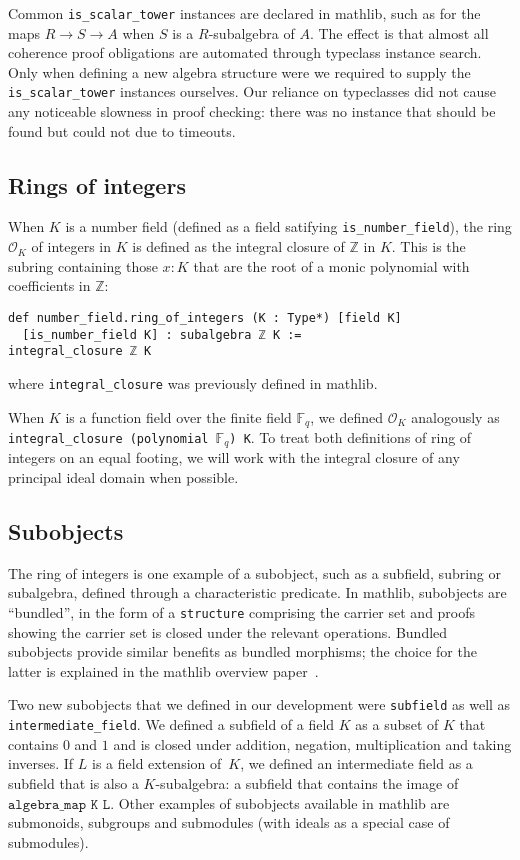 \documentclass[a4paper,USenglish,cleveref, autoref, thm-restate]{lipics-v2021}
\newcommand{\lean}[1]{\texttt{#1}\xspace}
\newcommand*{\OK}[1][K]{\mathcal{O}_{#1}}
\newcommand*{\Fq}[1][q]{\mathbb{F}_{#1}}
\newcommand{\mathlib}{\textsf{mathlib}\xspace}
\newcommand{\Z}{\mathbb{Z}}
\begin{document}
Common \lean{is\_scalar\_tower} instances are declared in \mathlib,
such as for the maps $R \to S \to A$ when $S$ is a $R$-subalgebra of $A$.
The effect is that almost all coherence proof obligations are automated through typeclass instance search.
Only when defining a new algebra structure were we required to supply the \lean{is\_scalar\_tower} instances ourselves.
Our reliance on typeclasses did not cause any noticeable slowness in proof checking:
there was no instance that should be found but could not due to timeouts.

\subsection{Rings of integers} \label{sec:ring-of-integers}

When $K$ is a number field (defined as a field satifying \lean{is\_number\_field}), the ring $\OK$ of integers in $K$ is defined as the integral closure of $\Z$ in $K$.
This is the subring containing those $x : K$ that are the root of a monic polynomial with coefficients in $\Z$:
\begin{lstlisting}
def number_field.ring_of_integers (K : Type*) [field K]
  [is_number_field K] : subalgebra ℤ K :=
integral_closure ℤ K
\end{lstlisting}
where \lean{integral\_closure} was previously defined in \mathlib.

When $K$ is a function field over the finite field $\Fq$, we defined $\OK$ analogously as \lean{integral\_closure (polynomial $\Fq$) K}.
To treat both definitions of ring of integers on an equal footing,
we will work with the integral closure of any principal ideal domain when possible.

\subsection{Subobjects} \label{sec:subobjects}

The ring of integers is one example of a subobject, such as a subfield, subring or subalgebra, defined through a characteristic predicate.
In \mathlib, subobjects are ``bundled'', in the form of a \lean{structure} comprising the carrier set and proofs showing the carrier set is closed under the relevant operations.
Bundled subobjects provide similar benefits as bundled morphisms; the choice for the latter is explained in the \mathlib overview paper~\cite{mathlib}.

Two new subobjects that we defined in our development were \lean{subfield} as well as \lean{intermediate\_field}. We defined a subfield of a field $K$ as a subset of $K$ that contains $0$ and $1$ and is closed under addition, negation, multiplication and taking inverses.
If $L$ is a field extension of~$K$, we defined an intermediate field as a subfield that is also a $K$-subalgebra: a subfield that contains the image of $\lean{algebra\_map K L}$.
Other examples of subobjects available in \mathlib are submonoids, subgroups and submodules (with ideals as a special case of submodules).
\end{document}
